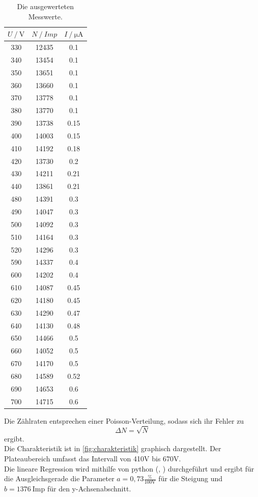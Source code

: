 \begin{table}[H]
  \centering
  \caption{Die ausgewerteten Messwerte.}
  \begin{tabular}{ccc}
    \toprule
    {$U  \mathbin{/} \unit{\volt}$} &
    {$N \mathbin{/} \mathbin{Imp}$} &
    {$I \mathbin{/} \unit{\micro\ampere}$} \\
    \midrule
    330  &  12435 &  0.1   \\
    340  &  13454 &  0.1   \\
    350  &  13651 &  0.1   \\
    360  &  13660 &  0.1   \\
    370  &  13778 &  0.1   \\
    380  &  13770 &  0.1   \\
    390  &  13738 &  0.15  \\
    400  &  14003 &  0.15  \\
    410  &  14192 &  0.18  \\
    420  &  13730 &  0.2   \\
    430  &  14211 &  0.21  \\
    440  &  13861 &  0.21  \\
    480  &  14391 &  0.3   \\
    490  &  14047 &  0.3   \\
    500  &  14092 &  0.3   \\
    510  &  14164 &  0.3   \\
    520  &  14296 &  0.3   \\
    590  &  14337 &  0.4   \\
    600  &  14202 &  0.4   \\
    610  &  14087 &  0.45  \\
    620  &  14180 &  0.45  \\
    630  &  14290 &  0.47  \\
    640  &  14130 &  0.48  \\
    650  &  14466 &  0.5   \\
    660  &  14052 &  0.5   \\
    670  &  14170 &  0.5   \\
    680  &  14589 &  0.52  \\
    690  &  14653 &  0.6   \\
    700  &  14715 &  0.6   \\
    \bottomrule
  \end{tabular}
  \label{tab:charak}
\end{table}

Die Zählraten entsprechen einer Poisson-Verteilung, sodass sich ihr Fehler zu 
\begin{equation*}
  \Delta N = \sqrt{N}
\end{equation*}
ergibt.\\
Die Charakteristik ist in \autoref{fig:charakteristik} graphisch dargestellt.
Der Plateaubereich umfasst das Intervall von 410V bis 670V.\\
Die lineare Regression wird mithilfe von python (\cite{numpy}, \cite{uncertainties}) durchgeführt und ergibt
für die Ausgleichsgerade die Parameter $a = 0,73 \mathrm{\frac{\%}{100 V}}$ für die Steigung und $b = 1376 \: \mathrm{Imp}$ für den y-Achsenabschnitt.\\

